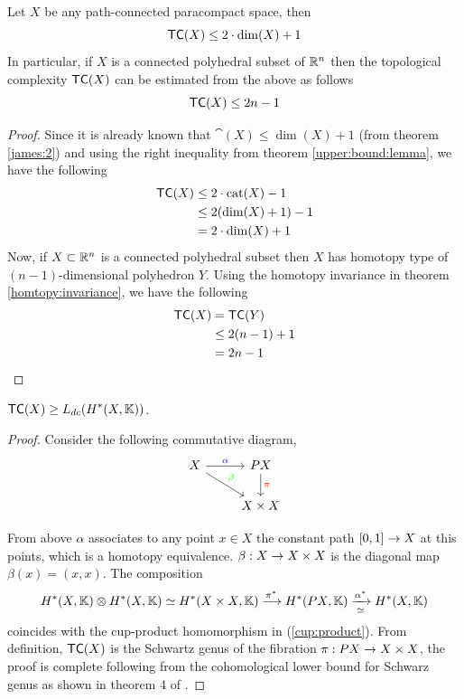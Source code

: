 \begin{thm}
    Let $X$ be any path-connected paracompact space, then
    \[
        \textsf{TC}(X) \le 2 \cdot \dim(X) + 1
    \]
    In particular, if $X$ is a connected polyhedral subset of $\mathbb{R}^n$ then the topological complexity $\textsf{TC}(X)$ can be estimated from the above as follows
    \[
        \textsf{TC}(X) \le 2n - 1
    \]
\end{thm}

\begin{proof}
    Since it is already known that $\cat(X) \le \dim(X) + 1$ (from theorem \ref{james:2}) and using the right inequality from theorem \ref{upper:bound:lemma}, we have the following
    \begin{align*}
        \textsf{TC}(X) & \le 2 \cdot \operatorname{cat}(X) - 1 \\
                  & \le 2 (\dim(X) + 1) - 1 \\
                  & = 2 \cdot \dim(X) + 1
    \end{align*}
    Now, if $X \subset \mathbb{R}^n$ is a connected polyhedral subset then $X$ has homotopy type of $(n-1)$-dimensional polyhedron $Y$. Using the homotopy invariance in theorem \ref{homtopy:invariance}, we have the following
    \begin{align*}
        \textsf{TC}(X) & = \textsf{TC}(Y)    \\
                  & \le 2(n-1) + 1 \\
                  & = 2n - 1
    \end{align*}
\end{proof}

\begin{lem}\label{zdcl:bound}
    $\displaystyle \textsf{TC}(X) \ge L_{dc}(H^*(X, \mathbb{K}))$.
\end{lem}

\begin{proof}
    Consider the following commutative diagram,
    \[
        \begin{tikzcd}
            X \arrow[rd,"\beta" green] \arrow[r, "\alpha" blue] & PX \arrow[d, "\pi" red] \\
            & X \times X
        \end{tikzcd}
    \]

    From above $\alpha$ associates to any point $x \in X$ the constant path $[0,1] \rightarrow X$ at this points, which is a homotopy equivalence. $\beta: X \rightarrow X \times X$ is the diagonal map $\beta(x) = (x,x)$. The composition
    \begin{equation}
        H^*(X, \mathbb{K}) \otimes H^*(X, \mathbb{K}) \simeq H^*(X \times X, \mathbb{K}) \xrightarrow{\pi^*} H^*(PX, \mathbb{K}) \xrightarrow[\simeq]{\alpha^*} H^*(X, \mathbb{K})
    \end{equation}
    coincides with the cup-product homomorphism in (\ref{cup:product}). From definition, $\textsf{TC}(X)$ is the Schwartz genus of the fibration $\pi: PX \rightarrow X \times X$, the proof is complete following from the cohomological lower bound for Schwarz genus as shown in theorem 4 of \cite{schwarz1961genus}.
\end{proof}

